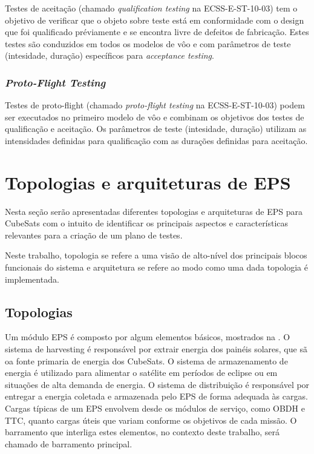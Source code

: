 Testes de aceitação (chamado \textit{qualification testing} na ECSS-E-ST-10-03) tem o objetivo de verificar que o objeto sobre teste está em conformidade com o design que foi qualificado préviamente e se encontra livre de defeitos de fabricação. Estes testes são conduzidos em todos os modelos de vôo e com parâmetros de teste (intesidade, duração) específicos para \textit{acceptance testing}.


\subsubsection*{\textit{Proto-Flight Testing}}

Testes de proto-flight (chamado \textit{proto-flight testing} na ECSS-E-ST-10-03) podem ser executados no primeiro modelo de vôo e combinam os objetivos dos testes de qualificação e aceitação. Os parâmetros de teste (intesidade, duração) utilizam as intensidades definidas para qualificação com as durações definidas para aceitação.



\section{Topologias e arquiteturas de EPS}\label{sec:arq-top}

Nesta seção serão apresentadas diferentes topologias e arquiteturas de \gls{EPS} para CubeSats com o intuito de identificar os principais aspectos e características relevantes para a criação de um plano de testes.

Neste trabalho, topologia se refere a uma visão de alto-nível dos principais blocos funcionais do sistema e arquitetura se refere ao modo como uma dada topologia é implementada.

\subsection{Topologias}\label{sec:topologias}

Um módulo \gls{EPS} é composto por algum elementos básicos, mostrados na .
O sistema de harvesting é responsável por extrair energia dos painéis solares, que sã oa fonte primaria de energia dos CubeSats.
O sistema de armazenamento de energia é utilizado para alimentar o satélite em períodos de eclipse ou em situações de alta demanda de energia.
O sistema de distribuição é responsável por entregar a energia coletada e armazenada pelo \gls{EPS} de forma adequada às cargas.
Cargas típicas de um \gls{EPS} envolvem desde os módulos de serviço, como \gls{OBDH} e \gls{TTC}, quanto cargas úteis que variam conforme os objetivos de cada missão.
O barramento que interliga estes elementos, no contexto deste trabalho, será chamado de barramento principal.


